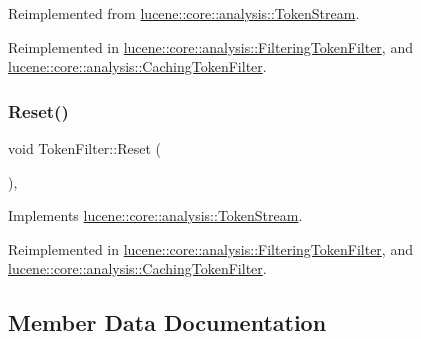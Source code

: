 Reimplemented from \mbox{\hyperlink{classlucene_1_1core_1_1analysis_1_1TokenStream_a4693985ca7fb242412049a074027b8b5}{lucene\+::core\+::analysis\+::\+Token\+Stream}}.



Reimplemented in \mbox{\hyperlink{classlucene_1_1core_1_1analysis_1_1FilteringTokenFilter_adf6b7aac9634afdffe1800a369753688}{lucene\+::core\+::analysis\+::\+Filtering\+Token\+Filter}}, and \mbox{\hyperlink{classlucene_1_1core_1_1analysis_1_1CachingTokenFilter_a7241be5e51e730f4e311572510de147e}{lucene\+::core\+::analysis\+::\+Caching\+Token\+Filter}}.

\mbox{\label{classlucene_1_1core_1_1analysis_1_1TokenFilter_a0671ee825db7735a7b72b7a27a457ed9}} 
\subsubsection{\texorpdfstring{Reset()}{Reset()}}
{\footnotesize\ttfamily void Token\+Filter\+::\+Reset (\begin{DoxyParamCaption}{ }\end{DoxyParamCaption})\hspace{0.3cm}{\ttfamily [override]}, {\ttfamily [virtual]}}



Implements \mbox{\hyperlink{classlucene_1_1core_1_1analysis_1_1TokenStream_ae24622f4bc0aeaf0bef924ff1661e023}{lucene\+::core\+::analysis\+::\+Token\+Stream}}.



Reimplemented in \mbox{\hyperlink{classlucene_1_1core_1_1analysis_1_1FilteringTokenFilter_ab85e4deab22d9dedd7ccb7b1f4750400}{lucene\+::core\+::analysis\+::\+Filtering\+Token\+Filter}}, and \mbox{\hyperlink{classlucene_1_1core_1_1analysis_1_1CachingTokenFilter_adde877fb8c464d6eb2766bd400a1499c}{lucene\+::core\+::analysis\+::\+Caching\+Token\+Filter}}.



\subsection{Member Data Documentation}
\mbox{\label{classlucene_1_1core_1_1analysis_1_1TokenFilter_aa7b4bf19056c271e00b91a46f2f37504}} 
